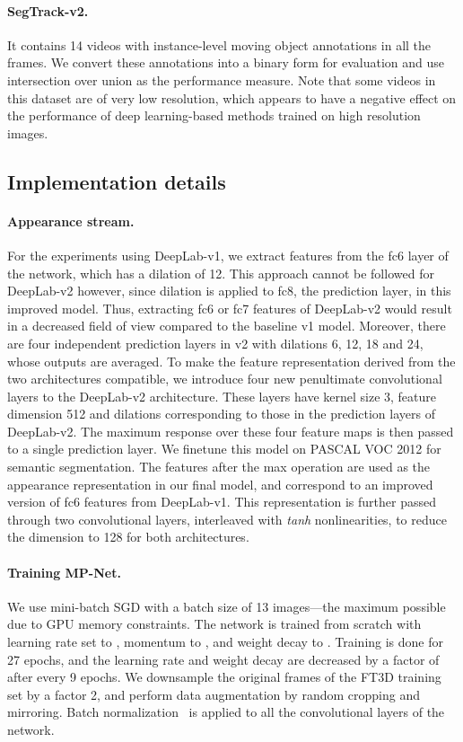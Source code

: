 \paragraph{\bf SegTrack-v2.} It contains 14 videos with instance-level moving
object annotations in all the frames. We convert these annotations into a
binary form for evaluation and use intersection over union as the performance
measure. Note that some videos in this dataset are of very low resolution,
which appears to have a negative effect on the performance of deep learning-based methods trained on high resolution images.

\subsection{Implementation details}

\paragraph{Appearance stream.} For the experiments using DeepLab-v1, we extract
features from the fc6 layer of the network, which has a dilation of 12. This
approach cannot be followed for DeepLab-v2 however, since dilation is applied
to fc8, the prediction layer, in this improved model. Thus, extracting fc6 or
fc7 features of DeepLab-v2 would result in a decreased field of view compared
to the baseline v1 model. Moreover, there are four independent prediction
layers in v2 with dilations 6, 12, 18 and 24, whose outputs are averaged. To
make the feature representation derived from the two architectures compatible,
we introduce four new penultimate convolutional layers to the DeepLab-v2
architecture. These layers have kernel size 3, feature dimension 512  and 
dilations corresponding to those in the prediction layers of DeepLab-v2. The maximum response over these four feature maps is then passed
to a single prediction layer. We finetune this model on PASCAL VOC 2012 for
semantic segmentation. The features after the max operation are used as the
appearance representation in our final model, and correspond to an improved
version of fc6 features from DeepLab-v1. This representation is further passed
through two  convolutional layers, interleaved with \textit{tanh}
nonlinearities, to reduce the dimension to 128 for both architectures. 

\paragraph{Training MP-Net.} We use mini-batch SGD with a batch size of 13
images---the maximum possible due to GPU memory constraints. The network is
trained from scratch with learning rate set to , momentum to , and
weight decay to . Training is done for 27 epochs, and the learning rate
and weight decay are decreased by a factor of  after every 9 epochs. We
downsample the original frames of the FT3D training set by a factor 2, and
perform data augmentation by random cropping and mirroring. Batch
normalization~\cite{ioffe2015batch} is applied to all the convolutional layers
of the network.


